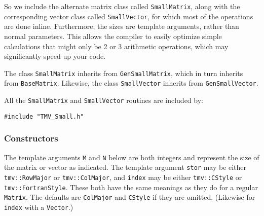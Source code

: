 \documentclass[twoside,letterpaper,11pt]{article}
\renewcommand{\tt}[1]{{\texttt {#1}}}
\begin{document}
So we include the alternate matrix class called \tt{SmallMatrix}, along 
with the corresponding vector class called \tt{SmallVector}, for which most of 
the operations are done inline.  Furthermore, the sizes are template arguments,
rather than normal parameters.  This allows the compiler to easily optimize
simple calculations that might only be 2 or 3 arithmetic operations, which
may significantly speed up your code.

The class \tt{SmallMatrix} inherits from \tt{GenSmallMatrix},
which in turn inherits from \tt{BaseMatrix}.
Likewise, the class \tt{SmallVector} inherits from \tt{GenSmallVector}.

All the \tt{SmallMatrix} and \tt{SmallVector} routines are included by:
\begin{verbatim}
#include "TMV_Small.h"
\end{verbatim}

\subsubsection{Constructors}

The template arguments \tt{M} and \tt{N} below are both integers and
represent the size of the matrix or vector as indicated.
The template argument \tt{stor} may be either \tt{tmv::RowMajor} or
\tt{tmv::ColMajor}, and
 \tt{index} may be either \tt{tmv::CStyle} or
\tt{tmv::FortranStyle}.  These both have the same meanings as they do 
for a regular \tt{Matrix}. The defaults are \tt{ColMajor} and \tt{CStyle} if they
are omitted.  (Likewise for \tt{index} with a \tt{Vector}.)
\end{document}
